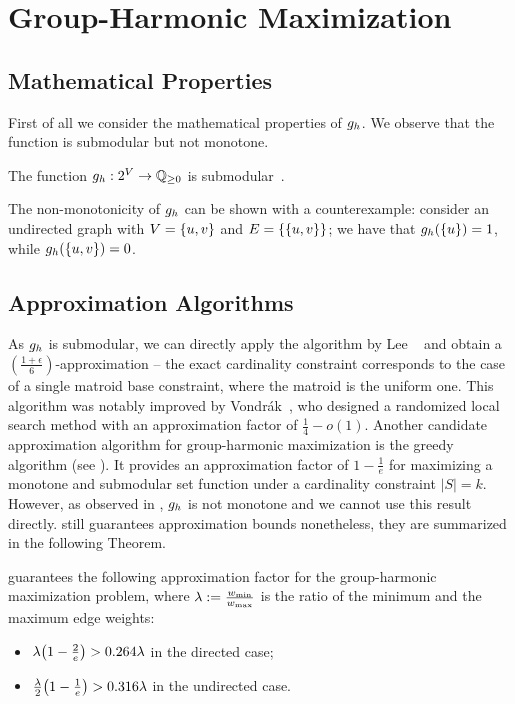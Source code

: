 \section{Group-Harmonic Maximization}
\subsection{Mathematical Properties}
\label{sec:gh-gc-gh-math-prop}

First of all we consider the mathematical properties of $g_h$.
We observe that the function is submodular but not monotone.

\begin{lemma}
The function $g_h : 2^V \to \mathbb{Q}_{\ge 0}$ is
submodular~\cite[Lemma 3.1]{DBLP:conf/alenex/AngrimanBDGGM21}.
\end{lemma}

The non-monotonicity of $g_h$ can be shown with a counterexample:
consider an undirected graph with $V = \set{u, v}$ and $E = \set{\set{u, v}}$;
we have that $\gharm(\set{u}) = 1$, while $\gharm(\set{u, v}) = 0$.

\subsection{Approximation Algorithms}
%


As $g_h$ is submodular, we can directly apply the algorithm by Lee
\etal~\cite{DBLP:journals/siamdm/LeeMNS10} and obtain a
$(\frac{1 + \epsilon}{6})$-approximation -- the exact cardinality
constraint corresponds to the case of a single matroid base constraint,
where the matroid is the uniform one.
This algorithm was notably improved by
Vondr\'ak~\cite{DBLP:conf/focs/Vondrak09}, who
designed a randomized local search method with an approximation factor
of $\frac{1}{4} - o(1)$.
Another candidate approximation algorithm for group-harmonic maximization
is the greedy algorithm (see ). It provides an
approximation factor of $1 - \frac{1}{e}$ for maximizing a monotone and
submodular set function under a cardinality constraint $|S| = k$.
However, as observed in , $g_h$ is not
monotone and we cannot use this result directly.
 still guarantees approximation bounds nonetheless, they
are summarized in the following Theorem.

\begin{theorem}
     guarantees the following approximation factor for the
    group-harmonic maximization problem, where $\lambda := \frac{w_{\min}}{w_{\max}}$
    is the ratio of the minimum and the maximum edge weights:
    \begin{itemize}
        \item$\lambda\roundb{1 - \frac 2e} > 0.264\lambda$ in the directed case;
        \item$\frac \lambda2\roundb{1 - \frac 1e} > 0.316\lambda$ in the undirected case.
    \end{itemize}
\end{theorem}

